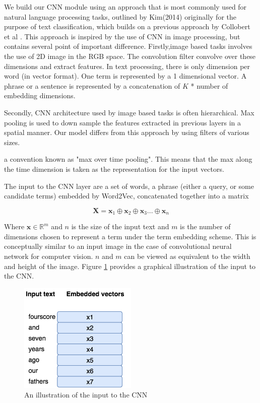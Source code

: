 We build our CNN module using an approach that is most commonly used for natural language processing tasks, outlined by Kim(2014) \cite{kim2014convolutional} originally for the purpose of text classification, which builds on a previous approach by Collobert et al \cite{collobert2011natural}. This approach is inspired by the use of CNN in image processing, but contains several point of important difference. Firstly,image based tasks involves the use of 2D image in the RGB space. The convolution filter convolve over these dimensions and extract features. In text processing, there is only dimension per word (in vector format). One term is represented by a 1 dimensional vector. A phrase or a sentence is represented by a concatenation of $K$ * number of embedding dimensions. 


Secondly, CNN architecture used by image based tasks is often hierarchical. Max pooling is used to down sample the features extracted in previous layers in a spatial manner. Our model differs from this approach by using filters of various sizes.


a convention known as "max over time pooling". This means that the max along the time dimension is taken as the representation for the input vectors. 

The input to the CNN layer are a set of words, a phrase (either a query, or some candidate terms) embedded by Word2Vec, concatenated together into a matrix

\begin{equation}
{\mathbf{X} = \mathbf{x}_1 \oplus \mathbf{x}_2\oplus \mathbf{x}_3 ... \oplus \mathbf{x}_n}
\end{equation}

Where $\mathbf{x} \in \mathbb{R}^m $ and $n$ is the size of the input text and $m$ is the number of dimensions chosen to represent a term under the term embedding scheme. This is conceptually similar to an input image in the case of convolutional neural network for computer vision. $n$ and $m$ can be viewed as equivalent to the width and height of the image. Figure \ref{fig:cnn_1} provides a graphical illustration of the input to the CNN. 

\begin{figure}

  \centering
    \includegraphics[width=0.5\textwidth]{images/chpt_3/cnn_1.png}
  \caption{An illustration of the input to the CNN}
    \label{fig:cnn_1}

\end{figure}


